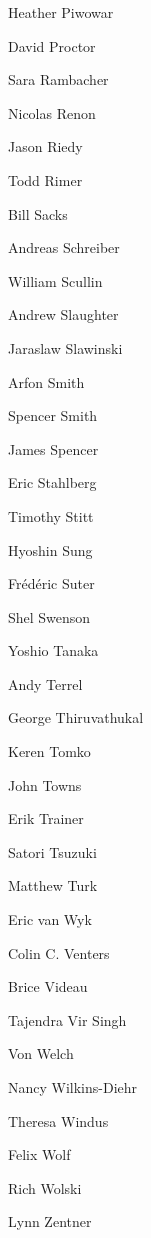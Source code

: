\documentclass[11pt, oneside]{amsart}
\begin{document}
\begin{multicols}{3}
Heather Piwowar

David Proctor

Sara Rambacher

Nicolas Renon

Jason Riedy

Todd Rimer

Bill Sacks

Andreas Schreiber

William Scullin

Andrew Slaughter

Jaraslaw Slawinski

Arfon Smith

Spencer Smith

James Spencer

Eric Stahlberg

Timothy Stitt

Hyoshin Sung

Fr\'{e}d\'{e}ric Suter

Shel Swenson

Yoshio Tanaka

Andy Terrel

George  Thiruvathukal

Keren Tomko

John Towns

Erik Trainer

Satori Tsuzuki

Matthew Turk

Eric van Wyk

Colin C. Venters

Brice Videau

Tajendra Vir Singh

Von Welch

Nancy Wilkins-Diehr

Theresa Windus

Felix Wolf

Rich Wolski

Lynn Zentner

\end{multicols}





\end{document}
